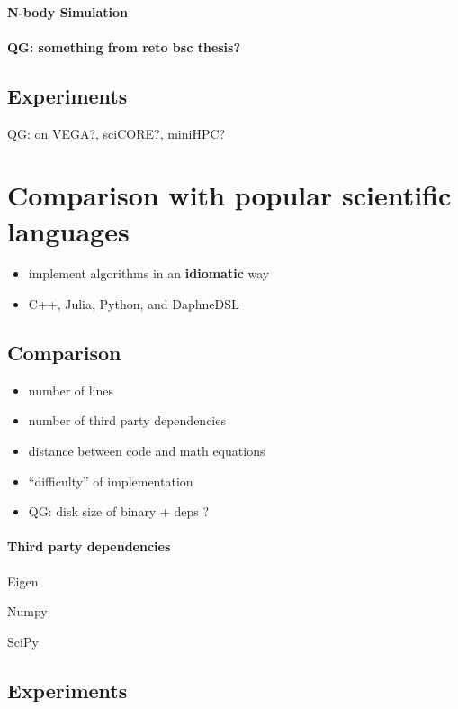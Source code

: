 \documentclass[conference,10pt]{IEEEtran}
\newcommand{\qg}[1]{{\color{blue} QG: #1}} %
\begin{document}
\paragraph{N-body Simulation}

\paragraph{\qg{something from reto bsc thesis?}}

\subsection{Experiments}

\qg{on VEGA?, sciCORE?, miniHPC?}

\section{Comparison with popular scientific languages}

\begin{itemize}
    \item implement algorithms in an \textbf{idiomatic} way
    \item C++, Julia, Python, and DaphneDSL
\end{itemize}


\subsection{Comparison}

\begin{itemize}
\item number of lines
\item number of third party dependencies
\item distance between code and math equations
\item ``difficulty'' of implementation
\item \qg{disk size of binary + deps ?}
\end{itemize}

\paragraph{Third party dependencies}

Eigen \cite{guennebaud2010eigen}

Numpy \cite{harris2020array}

SciPy \cite{virtanen2020scipy}


\subsection{Experiments}
\end{document}

